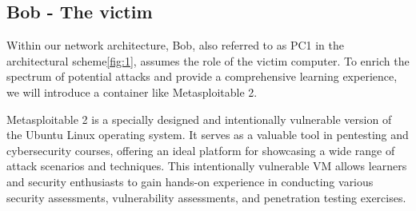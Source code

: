 \documentclass[a4paper,10pt]{article}
\begin{document}
\subsection{Bob - The victim}

Within our network architecture, Bob, also referred to as PC1 in the architectural scheme\ref{fig:1}, assumes the role of the victim computer. To enrich the spectrum of potential attacks and provide a comprehensive learning experience, we will introduce a container like Metasploitable 2.
\par
Metasploitable 2 is a specially designed and intentionally vulnerable version of the Ubuntu Linux operating system. It serves as a valuable tool in pentesting and cybersecurity courses, offering an ideal platform for showcasing a wide range of attack scenarios and techniques. This intentionally vulnerable VM allows learners and security enthusiasts to gain hands-on experience in conducting various security assessments, vulnerability assessments, and penetration testing exercises.
\end{document}
